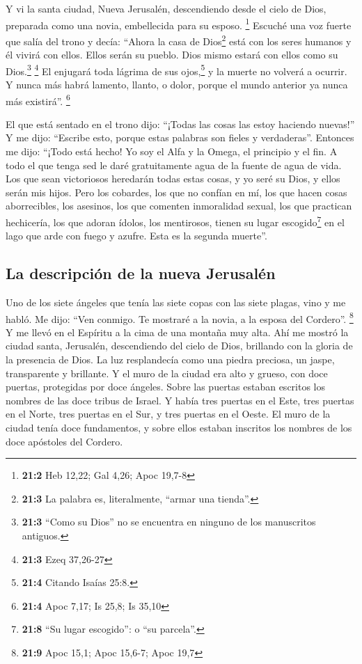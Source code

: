  Y vi la santa ciudad, Nueva Jerusalén, descendiendo desde
el cielo de Dios, preparada como una novia, embellecida para su esposo.
\footnote{\textbf{21:2} Heb 12,22; Gal 4,26; Apoc 19,7-8} 
Escuché una voz fuerte que salía del trono y decía: ``Ahora la casa de
Dios\footnote{\textbf{21:3} La palabra es, literalmente, ``armar una
  tienda''.} está con los seres humanos y él vivirá con ellos. Ellos
serán su pueblo. Dios mismo estará con ellos como su Dios.\footnote{\textbf{21:3}
  ``Como su Dios'' no se encuentra en ninguno de los manuscritos
  antiguos.} \footnote{\textbf{21:3} Ezeq 37,26-27}  El
enjugará toda lágrima de sus ojos,\footnote{\textbf{21:4} Citando Isaías
  25:8.} y la muerte no volverá a ocurrir. Y nunca más habrá lamento,
llanto, o dolor, porque el mundo anterior ya nunca más existirá''.
\footnote{\textbf{21:4} Apoc 7,17; Is 25,8; Is 35,10}

 El que está sentado en el trono dijo: ``¡Todas las cosas
las estoy haciendo nuevas!'' Y me dijo: ``Escribe esto, porque estas
palabras son fieles y verdaderas''.  Entonces me dijo:
``¡Todo está hecho! Yo soy el Alfa y la Omega, el principio y el fin. A
todo el que tenga sed le daré gratuitamente agua de la fuente de agua de
vida.  Los que sean victoriosos heredarán todas estas
cosas, y yo seré su Dios, y ellos serán mis hijos.  Pero
los cobardes, los que no confían en mí, los que hacen cosas
aborrecibles, los asesinos, los que comenten inmoralidad sexual, los que
practican hechicería, los que adoran ídolos, los mentirosos, tienen su
lugar escogido\footnote{\textbf{21:8} ``Su lugar escogido'': o ``su
  parcela''.} en el lago que arde con fuego y azufre. Esta es la segunda
muerte''.

\hypertarget{la-descripciuxf3n-de-la-nueva-jerusaluxe9n}{%
\subsection{La descripción de la nueva
Jerusalén}\label{la-descripciuxf3n-de-la-nueva-jerusaluxe9n}}

 Uno de los siete ángeles que tenía las siete copas con
las siete plagas, vino y me habló. Me dijo: ``Ven conmigo. Te mostraré a
la novia, a la esposa del Cordero''. \footnote{\textbf{21:9} Apoc 15,1;
  Apoc 15,6-7; Apoc 19,7}  Y me llevó en el Espíritu a la
cima de una montaña muy alta. Ahí me mostró la ciudad santa, Jerusalén,
descendiendo del cielo de Dios,  brillando con la gloria
de la presencia de Dios. La luz resplandecía como una piedra preciosa,
un jaspe, transparente y brillante.  Y el muro de la
ciudad era alto y grueso, con doce puertas, protegidas por doce ángeles.
Sobre las puertas estaban escritos los nombres de las doce tribus de
Israel.  Y había tres puertas en el Este, tres puertas en
el Norte, tres puertas en el Sur, y tres puertas en el Oeste.
 El muro de la ciudad tenía doce fundamentos, y sobre
ellos estaban inscritos los nombres de los doce apóstoles del Cordero.

